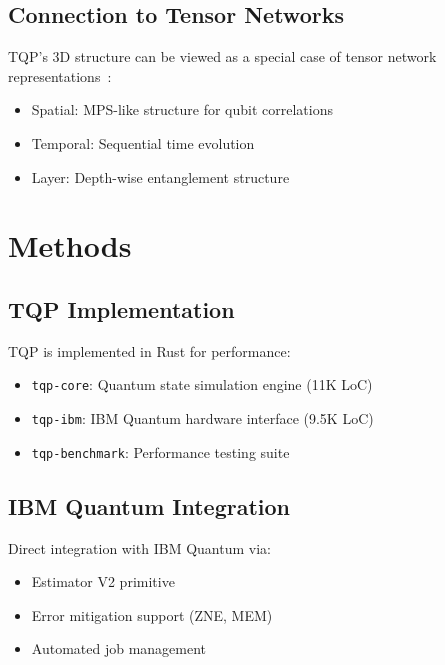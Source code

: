 \documentclass[aps,prx,twocolumn,superscriptaddress,floatfix]{revtex4-2}
\begin{document}
\subsection{Connection to Tensor Networks}

TQP's 3D structure can be viewed as a special case of tensor network representations~\cite{orus2014practical,schollwock2011dmrg}:
\begin{itemize}
    \item Spatial: MPS-like structure for qubit correlations
    \item Temporal: Sequential time evolution
    \item Layer: Depth-wise entanglement structure
\end{itemize}

\section{Methods}

\subsection{TQP Implementation}

TQP is implemented in Rust for performance:
\begin{itemize}
    \item \texttt{tqp-core}: Quantum state simulation engine (11K LoC)
    \item \texttt{tqp-ibm}: IBM Quantum hardware interface (9.5K LoC)
    \item \texttt{tqp-benchmark}: Performance testing suite
\end{itemize}

\subsection{IBM Quantum Integration}

Direct integration with IBM Quantum via:
\begin{itemize}
    \item Estimator V2 primitive
    \item Error mitigation support (ZNE, MEM)~\cite{kandala2019error,kim2023evidence}
    \item Automated job management
\end{itemize}
\end{document}
